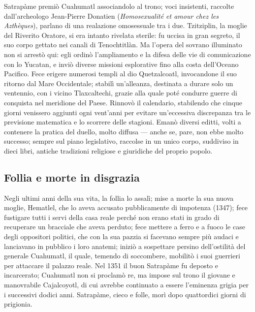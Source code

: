 \documentclass[italian,a4paper]{article}
\begin{document}
 Satrapàme premiò Cuahumatl associandolo al trono; voci insistenti, raccolte
 dall'archeologo Jean-Pierre Donatien (\emph{Homosexualité et amour chez les
 Azthèques}), parlano di una realazione omosessuale tra i due. Tzitziplin, la
 moglie del Riverito Oratore, si era intanto rivelata sterile: fu uccisa in
 gran segreto, il suo corpo gettato nei canali di Tenochtitlàn.
 Ma l'opera del sovrano illuminato non si arrestò qui: egli ordinò
 l'ampliamento e la difesa delle vie di comunicazione con lo Yucatan, e
 inviò diverse missioni esplorative fino alla costa dell'Oceano Pacifico.
 Fece erigere numerosi templi al dio Quetzalcoatl, invocandone il suo
 ritorno dal Mare Occidentale; stabilì un'alleanza, destinata a durare solo
 un ventennio, con i vicino Tlaxcaltechi, grazie alla quale poté condurre
 guerre di conquista nel meridione del Paese.
 Rinnovò il calendario, stabilendo che cinque giorni venissero aggiunti ogni
 vent'anni per evitare un'eccessiva discrepanza tra le previsione matematica
 e lo scorrere delle stagioni. Emanò diversi editti, volti a contenere la
 pratica del duello, molto diffusa --- anche se, pare, non ebbe molto
 successo; sempre sul piano legislativo, raccolse in un unico corpo,
 suddiviso in dieci libri, antiche tradizioni religiose e giuridiche del
 proprio popolo.
 \subsection*{Follia e morte in disgrazia}
 Negli ultimi anni della sua vita, la follia lo assalì; mise a morte la sua
 nuova moglie, Hematlel, che lo aveva accusato pubblicamente di impotenza
 (1347); fece fustigare tutti i servi della casa reale perché non erano
 stati in grado di recuperare un bracciale che aveva perduto; fece mettere a
 ferro e a fuoco le case degli oppositori politici, che con la sua pazzia si
 facevano sempre più audaci e lanciavano in pubblico i loro anatemi; iniziò
 a sospettare persino dell'ostilità del generale Cuahumatl, il quale,
 temendo di soccombere, mobilitò i suoi guerrieri per attaccare il palazzo
 reale. Nel 1351 il buon Satrapàme fu deposto e incarcerato; Cuahumatl non
 si proclamò re, ma impose sul trono il giovane e manovrabile Cajalcoyotl,
 di cui avrebbe continuato a essere l'eminenza grigia per i successivi
 dodici anni. Satrapàme, cieco e folle, morì dopo quattordici giorni di
 prigionia.
\end{document}
